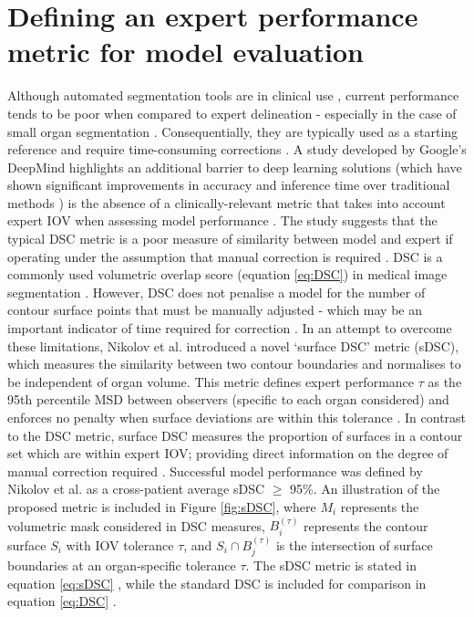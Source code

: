 \section{Defining an expert performance metric for model evaluation}
Although automated segmentation tools are in clinical use \cite{Zhu_2018}, current performance tends to be poor when compared to expert delineation - especially in the case of small organ segmentation \cite{Nikolov_2018, Zhu_2018}. Consequentially, they are typically used as a starting reference and require time-consuming corrections \cite{Nikolov_2018, Nemoto_2020}. A study developed by Google's DeepMind highlights an additional barrier to deep learning solutions (which have shown significant improvements in accuracy and inference time over traditional methods \cite{Zhu_2018}) is the absence of a clinically-relevant metric that takes into account expert IOV when assessing model performance \cite{Nikolov_2018}. The study suggests that the typical DSC metric is a poor measure of similarity between model and expert if operating under the assumption that manual correction is required \cite{Nikolov_2018}. DSC is a commonly used volumetric overlap score (equation \ref{eq:DSC}) in medical image segmentation \cite{Taha_2015}. However, DSC does not penalise a model for the number of contour surface points that must be manually adjusted \cite{Nikolov_2018} - which may be an important indicator of time required for correction \cite{Nikolov_2018}. In an attempt to overcome these limitations, Nikolov et al. introduced a novel `surface DSC' metric (sDSC), which measures the similarity between two contour boundaries and normalises to be independent of organ volume. This metric defines expert performance $\tau$ as the 95th percentile MSD between observers (specific to each organ considered) and enforces no penalty when surface deviations are within this tolerance \cite{Nikolov_2018}. In contrast to the DSC metric,  surface DSC measures the proportion of surfaces in a contour set which are within expert IOV; providing direct information on the degree of manual correction required \cite{Nikolov_2018}. Successful model performance was defined by Nikolov et al. as a cross-patient average sDSC $\geq$ 95\%. An illustration of the proposed metric is included in Figure \ref{fig:sDSC}, where $M_{i}$ represents the volumetric mask considered in DSC measures, $B_{i}^{(\tau)}$ represents the contour surface $S_{i}$ with IOV tolerance $\tau$, and $S_{i} \cap B_{j}^{(\tau)}$ is the intersection of surface boundaries at an organ-specific tolerance $\tau$. The sDSC metric is stated in equation \ref{eq:sDSC} \cite{Nemoto_2020}, while the standard DSC is included for comparison in equation \ref{eq:DSC} \cite{Bertels2019}.

